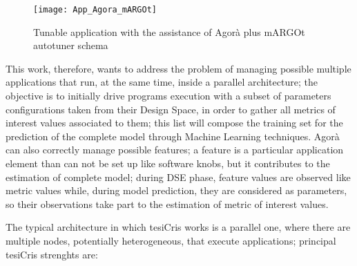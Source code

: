 \begin{figure}[H]

    \centering
    \texttt{[image: App\_Agora\_mARGOt]}
    \caption{Tunable application with the assistance of Agorà plus mARGOt autotuner schema}
    \label{fig::appAGORA}
    
\end{figure}

This work, therefore, wants to address the problem of managing possible multiple applications that run, at the same time, inside a parallel architecture; the objective is to initially drive programs execution with a subset of parameters configurations taken from their Design Space, in order to gather all metrics of interest values associated to them; this list will compose the training set for the prediction of the complete model through Machine Learning techniques. Agorà can also correctly manage possible features; a feature is a particular application element than can not be set up like software knobs, but it contributes to the estimation of complete model; during DSE phase, feature values are observed like metric values while, during model prediction, they are considered as parameters, so their observations take part to the estimation of metric of interest values.

The typical architecture in which tesiCris works is a parallel one, where there are multiple nodes, potentially heterogeneous, that execute applications; principal tesiCris strenghts are:

